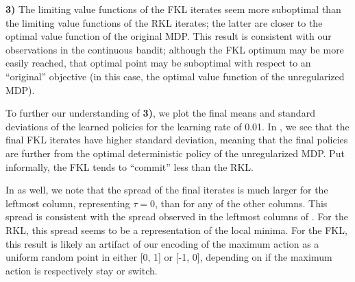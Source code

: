\documentclass[twoside,11pt]{article}
\begin{document}
\textbf{3)} The limiting value functions of the FKL iterates seem more suboptimal than the limiting value functions of the RKL iterates; the latter are closer to the optimal value function of the original MDP. This result is consistent with our observations in the continuous bandit; although the FKL optimum may be more easily reached, that optimal point may be suboptimal with respect to an ``original'' objective (in this case, the optimal value function of the unregularized MDP). 

To further our understanding of \textbf{3)}, we plot the final means and standard deviations of the learned policies for the learning rate of 0.01. In , we see that the final FKL iterates have higher standard deviation, meaning that the final policies are further from the optimal deterministic policy of the unregularized MDP. Put informally, the FKL tends to ``commit'' less than the RKL.  

In  as well, we note that the spread of the final iterates is much larger for the leftmost column, representing $\tau = 0$, than for any of the other columns. This spread is consistent with the spread observed in the leftmost columns of . For the RKL, this spread seems to be a representation of the local minima. For the FKL, this result is likely an artifact of our encoding of the maximum action as a uniform random point in either [0, 1] or [-1, 0], depending on if the maximum action is respectively stay or switch. 
\end{document}
